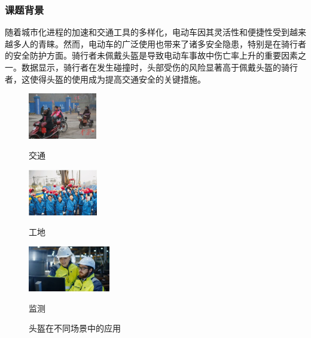 \documentclass[journal]{IEEEtran}
\numberwithin{figure}{section}%
\begin{document}
\subsubsection{课题背景}
随着城市化进程的加速和交通工具的多样化，电动车因其灵活性和便捷性受到越来越多人的青睐。然而，电动车的广泛使用也带来了诸多安全隐患，特别是在骑行者的安全防护方面。骑行者未佩戴头盔是导致电动车事故中伤亡率上升的重要因素之一。数据显示，骑行者在发生碰撞时，头部受伤的风险显著高于佩戴头盔的骑行者，这使得头盔的使用成为提高交通安全的关键措施。\par

\begin{figure}[h]
	
	\begin{minipage}{0.32\linewidth}
		\vspace{3pt}
		\centerline{\includegraphics[width=\textwidth,height=2cm]{figures/1_1.jpg}}
		\centerline{交通}
	\end{minipage}
	\begin{minipage}{0.32\linewidth}
		\vspace{3pt}
		\centerline{\includegraphics[width=\textwidth,height=2cm]{figures/1_2.jpg}}
	 
		\centerline{工地}
	\end{minipage}
	\begin{minipage}{0.32\linewidth}
		\vspace{3pt}
		\centerline{\includegraphics[width=\textwidth,height=2cm]{figures/1_3.jpg}}
	 
		\centerline{监测}
	\end{minipage}
 
	\caption{头盔在不同场景中的应用}
	\label{fig4}
\end{figure}
\end{document}
